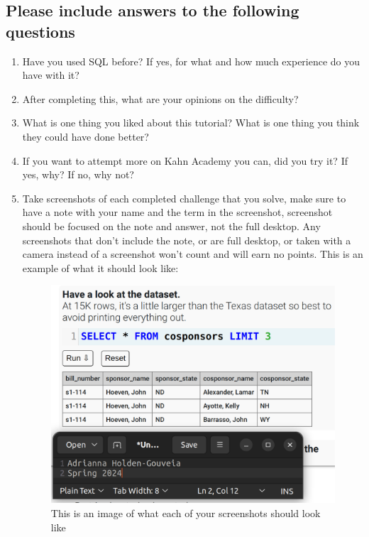 \documentclass[12pt]{article}
\begin{document}
\subsection*{Please include answers to the following questions}
    \begin{enumerate}
        \item Have you used SQL before? If yes, for what and how much experience do you have with it?
        \item After completing this, what are your opinions on the difficulty? 
        \item What is one thing you liked about this tutorial? What is one thing you think they could have done better?
        \item If you want to attempt more on Kahn Academy you can, did you try it? If yes, why? If no, why not?
        \item Take screenshots of each completed challenge that you solve, make sure to have a note with your name and the term in the screenshot, screenshot should be focused on the note and answer, not the full desktop.  Any screenshots that don't include the note, or are full desktop, or taken with a camera instead of a screenshot won't count and will earn no points. This is an example of what it should look like:        
 
        \begin{figure}[h!]
            \centerline{\includegraphics[scale=.2]{Examplewk6.png}}
            \caption{This is an image of what each of your screenshots should look like}

            \end{figure} 
    \end{enumerate}
\end{document}
